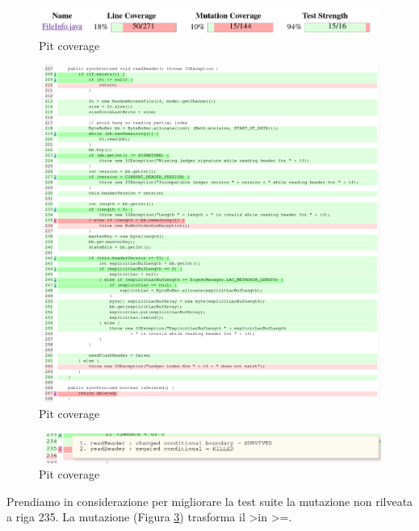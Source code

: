 \documentclass[12pt, a4paper]{article}
\begin{document}
\begin{figure}
  \includegraphics[width=\linewidth]{./images/file_info/PitCoverageReadHeader1.png}
  \caption{Pit coverage}
  \label{fig:PitCoverageReadHeader1}
\end{figure}

\begin{figure}
  \includegraphics[width=\linewidth]{./images/file_info/PitCoverageReadHeader2.png}
  \caption{Pit coverage}
  \label{fig:PitCoverageReadHeader2}
\end{figure}

\begin{figure}
  \includegraphics[width=\linewidth]{./images/file_info/PitCoverageReadHeader3.png}
  \caption{Pit coverage}
  \label{fig:PitCoverageReadHeader3}
\end{figure}

Prendiamo in considerazione per migliorare la test suite la mutazione non rilveata a riga 235. 
La mutazione (Figura \ref{fig:PitCoverageReadHeader3}) trasforma il \textgreater in \textgreater=.
\end{document}
